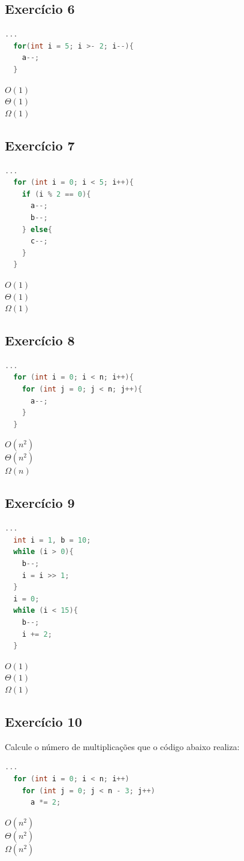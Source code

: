 \documentclass[12pt]{article}
\begin{document}
\subsection{Exercício 6}
\begin{lstlisting}[language=C]
  ...
  for(int i = 5; i >- 2; i--){
    a--;
  }
\end{lstlisting}
$O(1)$\\
$\Theta(1)$\\
$\Omega(1)$\\

\subsection{Exercício 7}
\begin{lstlisting}[language=C]
  ...
  for (int i = 0; i < 5; i++){
    if (i % 2 == 0){
      a--;
      b--;
    } else{
      c--;
    }
  }
\end{lstlisting}
$O(1)$\\
$\Theta(1)$\\
$\Omega(1)$\\


\subsection{Exercício 8}
\begin{lstlisting}[language=C]
  ...
  for (int i = 0; i < n; i++){
    for (int j = 0; j < n; j++){
      a--;
    }
  }
\end{lstlisting}
$O(n^2)$\\
$\Theta(n^2)$\\
$\Omega(n)$\\

\subsection{Exercício 9}
\begin{lstlisting}[language=C]
  ...
  int i = 1, b = 10;
  while (i > 0){
    b--;
    i = i >> 1;
  }
  i = 0;
  while (i < 15){
    b--;
    i += 2;
  }
\end{lstlisting}
$O(1)$\\
$\Theta(1)$\\
$\Omega(1)$\\

\subsection{Exercício 10}
Calcule o número de multiplicações que o código abaixo realiza:
\begin{lstlisting}[language=C]
  ...
  for (int i = 0; i < n; i++)
    for (int j = 0; j < n - 3; j++)
      a *= 2;
\end{lstlisting}
$O(n^2)$\\
$\Theta(n^2)$\\
$\Omega(n^2)$\\
\end{document}
